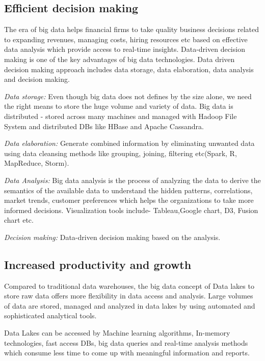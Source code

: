 \documentclass[sigconf]{acmart}
\begin{document}
\subsection{Efficient decision making}

The era of big data helps financial firms to take quality business decisions related to expanding revenues, managing costs, hiring resources etc based on effective data analysis which provide access to real-time insights.  Data-driven decision making is one of the key advantages of big data technologies. Data driven decision making approach includes data storage, data elaboration, data analysis and decision making. \cite{Accenture-Next-Generation-Financial}

\textit{Data storage:} Even though big data does not defines by the size alone, we need the right means to store the huge volume and variety of data. Big data is distributed - stored across many machines and managed with Hadoop File System and distributed DBs like HBase and Apache Cassandra.\cite{Big-data-storage}

\textit{Data elaboration:} Generate combined information by eliminating unwanted data using data cleansing methods like grouping, joining, filtering etc(Spark, R, MapReduce, Storm). 

\textit{Data Analysis:} Big data analysis is the process of analyzing the data to derive the semantics of the available data to understand the hidden patterns, correlations, market trends, customer preferences which helps the organizations to take more informed decisions. Visualization tools include- Tableau,Google chart, D3, Fusion chart etc.

\textit{Decision making:} Data-driven decision making based on the analysis.

\subsection{Increased productivity and growth}
Compared to traditional data warehouses, the big data concept of Data lakes to store raw data offers more flexibility in data access and analysis. Large volumes of data are stored, managed and analyzed in data lakes  by using automated and sophisticated analytical tools. 

Data Lakes can be accessed by Machine learning algorithms, In-memory technologies, fast access DBs, big data queries and real-time analysis methods which consume less time to come up with meaningful information and reports.
\end{document}
